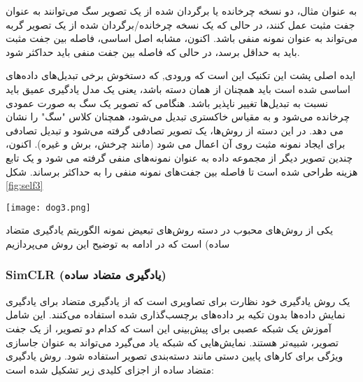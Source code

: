 به عنوان مثال، دو نسخه چرخانده یا برگردان شده از یک تصویر سگ می‌توانند به عنوان جفت  مثبت عمل کنند، در حالی که یک نسخه چرخانده/برگردان شده از یک تصویر گربه می‌تواند به عنوان نمونه منفی باشد. اکنون، مشابه اصل اساسی، فاصله بین جفت مثبت باید به حداقل برسد، در حالی که فاصله بین جفت منفی باید حداکثر شود.

ایده اصلی پشت این تکنیک این است که ورودی, که دستخوش برخی تبدیل‌های داده‌های اساسی شده است باید همچنان از همان دسته باشد، یعنی یک مدل یادگیری عمیق باید نسبت به تبدیل‌ها تغییر ناپذیر باشد. هنگامی که تصویر یک سگ به صورت عمودی چرخانده می‌شود و به مقیاس خاکستری تبدیل می‌شود، همچنان کلاس "سگ" را نشان می دهد.
\citep{taher2022caid}
در این دسته از روش‌ها، یک تصویر تصادفی گرفته می‌شود و تبدیل تصادفی برای ایجاد نمونه مثبت روی آن اعمال می شود (مانند چرخش، برش و غیره). اکنون، چندین تصویر دیگر از مجموعه داده به عنوان نمونه‌های منفی گرفته می شود و یک تابع هزینه طراحی شده است تا فاصله بین جفت‌های نمونه منفی را به حداکثر برساند. شکل \ref{fig:self3}

\begin{minipage}{\linewidth}
	\centering
	\texttt{[image: dog3.png]}
	\captionsetup{font=small} %
	\label{fig:self3}
\end{minipage}

یکی از روش‌های محبوب در دسته روش‌های تبعیض نمونه الگوریتم یادگیری متضاد ساده)  است که در ادامه به توضیح این روش می‌پردازیم


\subsubsection{SimCLR (یادگیری متضاد ساده)}


یک روش یادگیری خود نظارت برای تصاویری است که از یادگیری متضاد برای یادگیری نمایش داده‌ها بدون تکیه بر داده‌های برچسب‌گذاری شده استفاده می‌کنند. این شامل آموزش یک شبکه عصبی برای پیش‌بینی این است که کدام دو تصویر، از یک جفت تصویر، شبیه‌تر هستند. نمایش‌هایی که شبکه یاد می‌گیرد می‌تواند به عنوان جاسازی ویژگی برای کارهای پایین دستی مانند دسته‌بندی تصویر استفاده شود.
\citep{falcon2020framework}
روش یادگیری متضاد ساده از اجزای کلیدی زیر تشکیل شده است:

